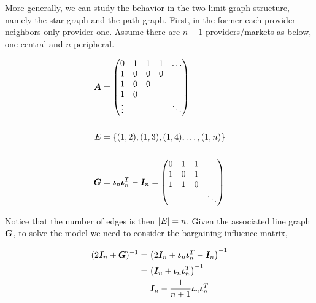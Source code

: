 More generally, we can study the behavior in the two limit graph structure, namely the star graph and the path graph. First, in the former each provider neighbors only provider one. Assume there are $n + 1$ providers/markets as below, one central and $n$ peripheral.

\vspace{5mm}
\begin{minipage}{.5\textwidth}
  \resizebox{\textwidth}{!}{}
\end{minipage}
\begin{minipage}{.5\textwidth}
  \begin{equation*}
    \begin{split}
      \matr{A} &= \begin{pmatrix}
        0      & 1 & 1 & 1 & \ldots \\
        1      & 0 & 0 & 0 &        \\
        1      & 0 & 0 &   &        \\
        1      & 0 &   &   &        \\
        \vdots &   &   &   & \ddots
      \end{pmatrix} \\
      \vspace{5mm} \\
      E &= \set{(1, 2), (1, 3), (1, 4), \ldots, (1, n)} \\
      \vspace{5mm} \\
      \G &= \matr{\iota}_n \matr{\iota}_n^T - \I_n =  \begin{pmatrix}
        0 & 1 & 1 &        \\
        1 & 0 & 1 &        \\
        1 & 1 & 0 &        \\
          &   &   & \ddots
      \end{pmatrix}
    \end{split}
  \end{equation*}
\end{minipage}
\vspace{5mm}

Notice that the number of edges is then $\lvert E\rvert = n$. Given the associated line graph $\bm{G}$, to solve the model we need to consider the bargaining influence matrix,

\begin{equation*}
  \begin{split}
    (2\bm{I}_n + \bm{G})^{-1} &= \left( 2\bm{I}_n + \bm{\iota}_n \bm{\iota}_n^T - \bm{I}_n \right)^{-1}\\
    &= \left( \bm{I}_n + \bm{\iota}_n \bm{\iota}_n^T \right)^{-1} \\
    &= \bm{I}_n - \frac{1}{n + 1} \bm{\iota}_n \bm{\iota}_n^T
  \end{split}
\end{equation*}

